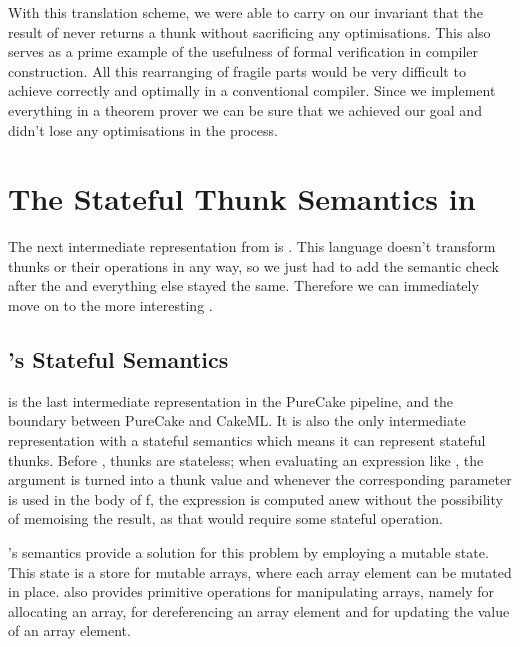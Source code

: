 With this translation scheme, we were able to carry on our invariant that the
result of  never returns a thunk without sacrificing any
optimisations. This also serves as a prime example of the usefulness of formal
verification in compiler construction. All this rearranging of fragile parts
would be very difficult to achieve correctly and optimally in a conventional
compiler. Since we implement everything in a theorem prover we can be sure that
we achieved our goal and didn't lose any optimisations in the process.

\section{The Stateful Thunk Semantics in \StateLang{}}

The next intermediate representation from \ThunkLang{} is \EnvLang{}. This
language doesn't transform thunks or their operations in any way, so we just had
to add the semantic check after the  and everything else stayed the
same. Therefore we can immediately move on to the more interesting \StateLang{}.

\subsection{\StateLang{}'s Stateful Semantics}

\StateLang{} is the last intermediate representation in the PureCake pipeline,
and the boundary between PureCake and CakeML. It is also the only intermediate
representation with a stateful semantics which means it can represent stateful
thunks. Before \StateLang{}, thunks are stateless; when evaluating an expression
like , the argument  is turned
into a thunk value and whenever the corresponding parameter is used in the body
of f, the expression  is computed anew without the possibility of
memoising the result, as that would require some stateful operation.

\StateLang{}'s semantics provide a solution for this problem by employing a
mutable state. This state is a store for mutable arrays, where each array
element can be mutated in place. \StateLang{} also provides primitive operations
for manipulating arrays, namely  for allocating an array, 
for dereferencing an array element and  for updating the value of an
array element.

